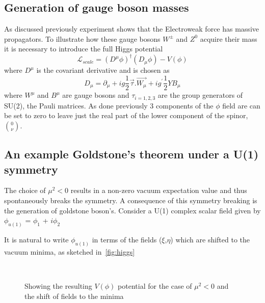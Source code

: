 \subsection{Generation of gauge boson masses}


As discussed previously experiment shows that the Electroweak force has massive propagators. To illustrate how these gauge bosons $W^{\pm}$ and $Z^{0}$ acquire their mass it is necessary to introduce the full Higgs potential
\begin{equation}
\mathcal{L}_{scale} = (D^{\mu}\phi)^{\dagger}(D_{\mu}\phi) - V(\phi)
\end{equation}
where $D^{\mu}$ is the covariant derivative and is chosen as %
\begin{equation}
  D_{\mu} = \partial_{\mu}+ig\frac{1}{2}\vec{\tau}.\vec{W_{\mu}} + ig^{'}\frac{1}{2}YB_{\mu}
  \label{eq:higgscodev}
\end{equation}
where $W^{\mu}$ and $B^{\mu}$ are gauge bosons and $\tau_{i = 1,2,3}$ are the group generators of SU(2), the Pauli matrices. As done previously 3 components of the $\phi$ field are can be set to zero to leave just the real part of the lower component of the spinor, $\binom{0}{\nu}$.
\subsection{An example Goldstone's theorem under a  U(1) symmetry}
The choice of $\mu^{2} < 0$ results in a non-zero vacuum expectation value and thus spontaneously breaks the symmetry. %
A consequence of this symmetry breaking is the generation of goldstone boson's. Consider a U(1) complex scalar field given by
$\phi_{u(1)}$ = $\phi_{1}$ + $i\phi_{2}$

It is natural to write $\phi_{u(1)}$ in terms of the fields ($\xi$,$\eta$) which are shifted to the vacuum minima, as sketched in~\autoref{fig:higgs}
\begin{figure}[ht!]
  \centering
  \\
           \caption{Showing \protect{} the resulting $V(\phi)$ potential for the case of $\mu^{2}<0$ and \protect{} the shift of fields to the minima}
           \label{fig:higgs}
\end{figure}



